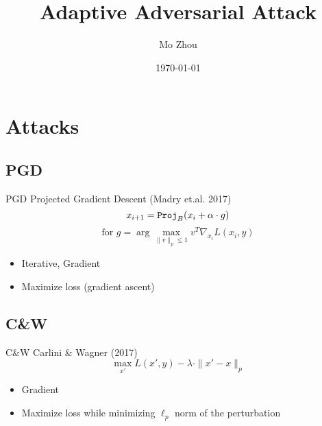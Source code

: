 \documentclass[12,times]{beamer}
\title{Adaptive Adversarial Attack}
\author{Mo Zhou}
\date{\today}
\begin{document}
	
\begin{frame}
	\titlepage
\end{frame}

\begin{comment}
\begin{frame}
	\begin{columns}
		\column{0.5\textwidth}{left column}
		\column{0.5\textwidth}{right column}
	\end{columns}
	\begin{block}{Block title}
		content 
	\end{block}
	\pause
	\begin{alertblock}{alert}
		test
	\end{alertblock}
	\pause
	\begin{exampleblock}{example}
		test
	\end{exampleblock}
\end{frame}
\end{comment}

\begin{frame}
	\tableofcontents
\end{frame}

\section{Attacks}

\subsection{PGD}
\begin{frame}{PGD}
	Projected Gradient Descent (Madry et.al. 2017)
	$$ x_{i+1} = \text{\tt Proj}_B(x_i + \alpha \cdot g) $$
	$$ \text{for } g = \arg\max_{\|v\|_p \leq 1} v^T \nabla_{x_i} L(x_i,y) $$
	\begin{itemize}
		\item Iterative, Gradient
		\item Maximize loss (gradient ascent)
	\end{itemize}
\end{frame}

\subsection{C\&W}
\begin{frame}{C\&W}
	Carlini \& Wagner (2017)
	$$ \max_{x'} L(x', y) - \lambda \cdot \|x'-x\|_p $$
	\begin{itemize}
		\item Gradient
		\item Maximize loss while minimizing $\ell_p$ norm of the perturbation
	\end{itemize}
\end{frame}
\end{document}
